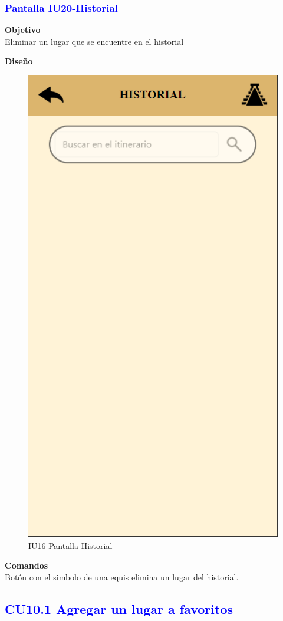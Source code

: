 \subsubsection{\textcolor{blue}{Pantalla IU20-Historial}}

\textbf{Objetivo} \\
Eliminar un lugar que se encuentre en el historial

\textbf{Diseño}

    \begin{figure}[h]
        
            \centering
            \includegraphics[width=.4\linewidth]{entregable final/pantallasSistema/IU16 Pantalla Historial.png}
    \caption{IU16 Pantalla Historial}
    
    \end{figure}
\textbf{Comandos} \\
Botón con el simbolo de una equis elimina un lugar del historial.



\pagebreak
\subsection{\textcolor{blue}{CU10.1 Agregar un lugar a favoritos}}
